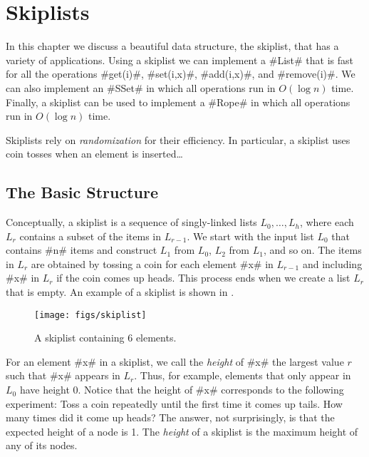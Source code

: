 \chapter{Skiplists}

In this chapter we discuss a beautiful data structure, the skiplist,
that has a variety of applications.  Using a skiplist we can implement
a #List# that is fast for all the operations #get(i)#, #set(i,x)#,
#add(i,x)#, and #remove(i)#. We can also implement an #SSet# in which
all operations run in $O(\log n)$ time.  Finally, a skiplist can be used
to implement a #Rope# in which all operations run in $O(\log n)$ time.

Skiplists rely on \emph{randomization} for their efficiency.  In
particular, a skiplist uses coin tosses when an element is inserted\ldots

\section{The Basic Structure}

Conceptually, a skiplist is a sequence of singly-linked lists
$L_0,\ldots,L_h$, where each $L_r$ contains a subset of the items
in $L_{r-1}$.  We start with the input list $L_0$ that contains #n#
items and construct $L_1$ from $L_0$, $L_2$ from $L_1$, and so on.
The items in $L_r$ are obtained by tossing a coin for each element #x#
in $L_{r-1}$ and including #x# in $L_r$ if the coin comes up heads.
This process ends when we create a list $L_r$ that is empty.  An example
of a skiplist is shown in .

\begin{figure}
  \begin{center}
    \texttt{[image: figs/skiplist]}
  \end{center}
  \caption{A skiplist containing 6 elements.}
\end{figure}

For an element #x# in a skiplist, we call the \emph{height} of #x# the
largest value $r$ such that #x# appears in $L_r$.  Thus, for example,
elements that only appear in $L_0$ have height $0$.  Notice that the
height of #x# corresponds to the following experiment:  Toss a coin
repeatedly until the first time it comes up tails.  How many times did
it come up heads?  The answer, not surprisingly, is that the expected
height of a node is 1.  The \emph{height} of a skiplist is the maximum
height of any of its nodes.

